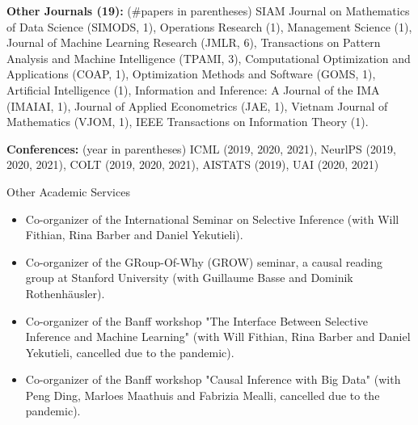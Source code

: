 \documentclass{article}
\begin{document}
\vspace{2mm}
\noindent \textbf{Other Journals (19): }(\#papers in parentheses) SIAM Journal on Mathematics of Data Science (SIMODS, 1), Operations Research (1), Management Science (1), Journal of Machine Learning Research (JMLR, 6), Transactions on Pattern Analysis and Machine Intelligence (TPAMI, 3), Computational Optimization and Applications (COAP, 1), Optimization Methods and Software (GOMS, 1), Artificial Intelligence (1), Information and Inference: A Journal of the IMA (IMAIAI, 1), Journal of Applied Econometrics (JAE, 1), Vietnam Journal of Mathematics (VJOM, 1), IEEE Transactions on Information Theory (1).

\vspace{2mm}
\noindent \textbf{Conferences: }(year in parentheses) ICML (2019, 2020, 2021), NeurlPS (2019, 2020, 2021), COLT (2019, 2020, 2021), AISTATS (2019), UAI (2020, 2021)

\vspace{5mm}
\begin{large}
\noindent Other Academic Services
\end{large}

\begin{itemize}
\item Co-organizer of the International Seminar on Selective Inference (with Will Fithian, Rina Barber and Daniel Yekutieli).
\item Co-organizer of the GRoup-Of-Why (GROW) seminar, a causal reading group at Stanford University (with Guillaume Basse and Dominik Rothenhäusler).
\item Co-organizer of the Banff workshop "The Interface Between Selective Inference and Machine Learning" (with Will Fithian, Rina Barber and Daniel Yekutieli, cancelled due to the pandemic).
\item Co-organizer of the Banff workshop "Causal Inference with Big Data" (with Peng Ding, Marloes Maathuis and Fabrizia Mealli, cancelled due to the pandemic).
\end{itemize}
\end{document}
